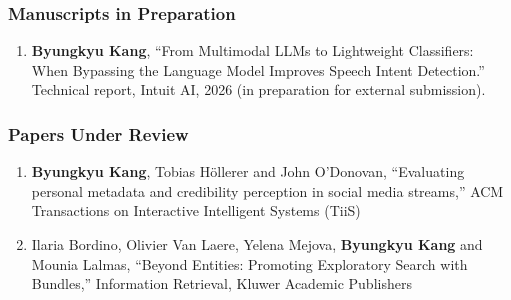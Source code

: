 \documentclass[10pt]{article}
\makeatletter
\newlength{\bibhang}
\newlength{\bibsep}
 {\@listi \global\bibsep\itemsep \global\advance\bibsep by\parsep}
\newenvironment{bibsection}%
        {\begin{enumerate}{}{%
       \setlength{\leftmargin}{\bibhang}%
       \setlength{\itemindent}{-\leftmargin}%
       \setlength{\itemsep}{\bibsep}%
       \setlength{\parsep}{\z@}%
        \setlength{\partopsep}{0pt}%
        \setlength{\topsep}{0pt}}}
        {\end{enumerate}\vspace{-.6\baselineskip}}
\makeatother
\begin{document}
\subsubsection*{Manuscripts in Preparation}
\begin{bibsection}
   \item[--] {\bf Byungkyu Kang}, ``From Multimodal LLMs to Lightweight Classifiers: When Bypassing the Language Model Improves Speech Intent Detection.'' Technical report, Intuit AI, 2026 (in preparation for external submission).
\end{bibsection}

\subsubsection*{Papers Under Review}
\begin{bibsection}

   \item[--] {\bf Byungkyu Kang}, Tobias H{\"o}llerer and John O'Donovan, ``Evaluating personal metadata and credibility perception in social media streams,'' ACM Transactions on Interactive Intelligent Systems (TiiS)
   
   \item[--] Ilaria Bordino, Olivier Van Laere, Yelena Mejova, {\bf Byungkyu Kang} and Mounia Lalmas, ``Beyond Entities: Promoting Exploratory Search with Bundles,'' Information Retrieval, Kluwer Academic Publishers
\end{bibsection}  
\end{document}
